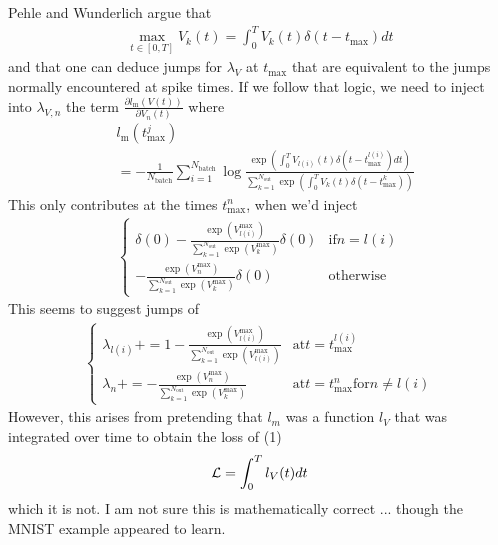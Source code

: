 \documentclass[a4paper]{article}
\newcommand{\blue}[1]{{\color{blue}#1}}
\begin{document}
  Pehle and Wunderlich argue that
  \begin{align}
    \max_{t \in [0, T]} V_{k}(t) = \int_0^T V_{k}(t) \delta(t-t_{\text{max}}) dt
  \end{align}   
   and that one can deduce jumps for $\lambda_V$ at $t_{\text{max}}$ that are equivalent to the jumps normally encountered at spike times. If we follow that logic, we need to inject into $\lambda_{V,n}$ the term $\frac{\partial l_{\text{m}}(V(t))}{\partial V_n(t)}$ where
  \begin{align}
    &l_{\text{m}}(t_{\text{max}}^{j})  \\
    &= - \frac{1}{N_{\text{batch}}} \sum_{i=1}^{N_{\text{batch}}} \log \frac{\exp\left(\int_0^T V_{l(i)}(t) \delta(t-t_{\text{max}}^{l(i)}) dt\right)}{\sum_{k=1}^{N_{\text{out}}}\exp\left(\int_0^T  V_{k}(t)\delta(t-t_{\text{max}}^k) \right)}
  \end{align}
  This only contributes at the times $t_{\text{max}}^{n}$, when we'd inject
  \begin{align}
    \left\{\begin{array}{ll}
    \delta(0) - \frac{\exp(V_{l(i)}^{\text{max}})}{\sum_{k=1}^{N_{\text{out}}} \exp(V_{k}^{\text{max}})} \delta(0) & \text{if} n= l(i) \\
    - \frac{\exp(V_{n}^{\text{max}})}{\sum_{k=1}^{N_{\text{out}}} \exp(V_{k}^{\text{max}})} \delta(0) & \text{otherwise}
    \end{array} \right.
    \end{align}
This seems to suggest jumps of 
\begin{align}
      \left\{\begin{array}{ll}
  \lambda_{l(i)} +=  1 - \frac{\exp(V_{l(i)}^{\text{max}})}{\sum_{k=1}^{N_{\text{out}}} \exp(V_{l(i)}^{\text{max}})} & \text{at}  t= t_{\text{max}}^{l(i)} \\
 \lambda_{n} += - \frac{\exp(V_{n}^{\text{max}})}{\sum_{k=1}^{N_{\text{out}}} \exp(V_{k}^{\text{max}})} & \text{at} t= t_{\text{max}}^{n} \text{for} n \neq l(i)
      \end{array} \right.
\end{align}
However, this arises from pretending that $l_m$ was a function $l_V$
that was integrated over time to obtain the loss of {\blue
    (1)}
\begin{align}
  {\cal L}= \int_{0}^T l_V (t) dt
\end{align}
which it is not. I am not sure this is mathematically correct ... though the MNIST example appeared to learn.
\end{document}
